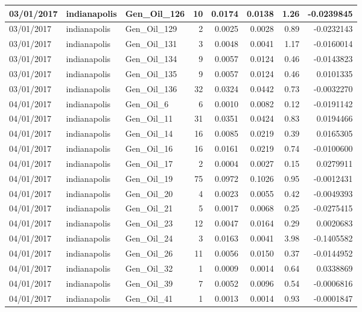 \documentclass[
  letterpaper,
  DIV=11,
  numbers=noendperiod]{scrartcl}
\begin{document}
\begin{tabular}{l|l|l|r|r|r|r|r}
\hline
03/01/2017 & indianapolis & Gen\_Oil\_126 & 10 & 0.0174 & 0.0138 & 1.26 & -0.0239845\\
\hline
03/01/2017 & indianapolis & Gen\_Oil\_129 & 2 & 0.0025 & 0.0028 & 0.89 & -0.0232143\\
\hline
03/01/2017 & indianapolis & Gen\_Oil\_131 & 3 & 0.0048 & 0.0041 & 1.17 & -0.0160014\\
\hline
03/01/2017 & indianapolis & Gen\_Oil\_134 & 9 & 0.0057 & 0.0124 & 0.46 & -0.0143823\\
\hline
03/01/2017 & indianapolis & Gen\_Oil\_135 & 9 & 0.0057 & 0.0124 & 0.46 & 0.0101335\\
\hline
03/01/2017 & indianapolis & Gen\_Oil\_136 & 32 & 0.0324 & 0.0442 & 0.73 & -0.0032270\\
\hline
04/01/2017 & indianapolis & Gen\_Oil\_6 & 6 & 0.0010 & 0.0082 & 0.12 & -0.0191142\\
\hline
04/01/2017 & indianapolis & Gen\_Oil\_11 & 31 & 0.0351 & 0.0424 & 0.83 & 0.0194466\\
\hline
04/01/2017 & indianapolis & Gen\_Oil\_14 & 16 & 0.0085 & 0.0219 & 0.39 & 0.0165305\\
\hline
04/01/2017 & indianapolis & Gen\_Oil\_16 & 16 & 0.0161 & 0.0219 & 0.74 & -0.0100600\\
\hline
04/01/2017 & indianapolis & Gen\_Oil\_17 & 2 & 0.0004 & 0.0027 & 0.15 & 0.0279911\\
\hline
04/01/2017 & indianapolis & Gen\_Oil\_19 & 75 & 0.0972 & 0.1026 & 0.95 & -0.0012431\\
\hline
04/01/2017 & indianapolis & Gen\_Oil\_20 & 4 & 0.0023 & 0.0055 & 0.42 & -0.0049393\\
\hline
04/01/2017 & indianapolis & Gen\_Oil\_21 & 5 & 0.0017 & 0.0068 & 0.25 & -0.0275415\\
\hline
04/01/2017 & indianapolis & Gen\_Oil\_23 & 12 & 0.0047 & 0.0164 & 0.29 & 0.0020683\\
\hline
04/01/2017 & indianapolis & Gen\_Oil\_24 & 3 & 0.0163 & 0.0041 & 3.98 & -0.1405582\\
\hline
04/01/2017 & indianapolis & Gen\_Oil\_26 & 11 & 0.0056 & 0.0150 & 0.37 & -0.0144952\\
\hline
04/01/2017 & indianapolis & Gen\_Oil\_32 & 1 & 0.0009 & 0.0014 & 0.64 & 0.0338869\\
\hline
04/01/2017 & indianapolis & Gen\_Oil\_39 & 7 & 0.0052 & 0.0096 & 0.54 & -0.0006816\\
\hline
04/01/2017 & indianapolis & Gen\_Oil\_41 & 1 & 0.0013 & 0.0014 & 0.93 & -0.0001847\\

\end{tabular}
\end{document}
